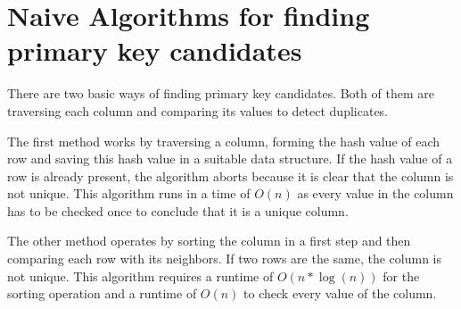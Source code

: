 \section{Naive Algorithms for finding primary key candidates}\label{sec:naive_algorithm}
There are two basic ways of finding primary key candidates. Both of them are traversing each column and comparing its values to detect duplicates.

The first method works by traversing a column, forming the hash value of each row and saving this hash value in a suitable data structure. If the hash value of a row is already present, the algorithm aborts because it is clear that the column is not unique. This algorithm runs in a time of \(O(n)\) as every value in the column has to be checked once to conclude that it is a unique column.

The other method operates by sorting the column in a first step and then comparing each row with its neighbors. If two rows are the same, the column is not unique. This algorithm requires a runtime of \(O(n*\log(n))\) for the sorting operation and a runtime of \(O(n)\) to check every value of the column.

